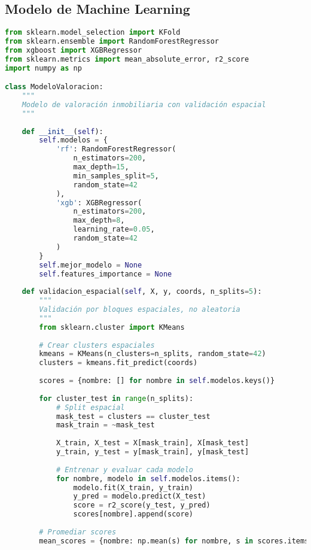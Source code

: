 \documentclass[11pt,a4paper]{article}
\begin{document}
\subsection{Modelo de Machine Learning}

\begin{lstlisting}[language=Python]
from sklearn.model_selection import KFold
from sklearn.ensemble import RandomForestRegressor
from xgboost import XGBRegressor
from sklearn.metrics import mean_absolute_error, r2_score
import numpy as np

class ModeloValoracion:
    """
    Modelo de valoración inmobiliaria con validación espacial
    """
    
    def __init__(self):
        self.modelos = {
            'rf': RandomForestRegressor(
                n_estimators=200,
                max_depth=15,
                min_samples_split=5,
                random_state=42
            ),
            'xgb': XGBRegressor(
                n_estimators=200,
                max_depth=8,
                learning_rate=0.05,
                random_state=42
            )
        }
        self.mejor_modelo = None
        self.features_importance = None
        
    def validacion_espacial(self, X, y, coords, n_splits=5):
        """
        Validación por bloques espaciales, no aleatoria
        """
        from sklearn.cluster import KMeans
        
        # Crear clusters espaciales
        kmeans = KMeans(n_clusters=n_splits, random_state=42)
        clusters = kmeans.fit_predict(coords)
        
        scores = {nombre: [] for nombre in self.modelos.keys()}
        
        for cluster_test in range(n_splits):
            # Split espacial
            mask_test = clusters == cluster_test
            mask_train = ~mask_test
            
            X_train, X_test = X[mask_train], X[mask_test]
            y_train, y_test = y[mask_train], y[mask_test]
            
            # Entrenar y evaluar cada modelo
            for nombre, modelo in self.modelos.items():
                modelo.fit(X_train, y_train)
                y_pred = modelo.predict(X_test)
                score = r2_score(y_test, y_pred)
                scores[nombre].append(score)
        
        # Promediar scores
        mean_scores = {nombre: np.mean(s) for nombre, s in scores.items()}
        

\end{lstlisting}
\end{document}
